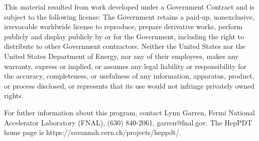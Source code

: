 This material resulted from work developed under a Government Contract
and is subject to the following license:  The Government retains a
paid-up, nonexclusive, irrevocable worldwide license to reproduce,
prepare derivative works, perform publicly and display publicly by or for
the Government,  including the right to distribute to other Government
contractors.  Neither the United States nor the United States Department
of Energy, nor any of their employees, makes any warranty, express or
implied, or assumes any legal liability or responsibility for the
accuracy, completeness, or usefulness of any  information, apparatus,
product, or process disclosed, or represents that its use would not
infringe privately owned rights.
 
For futher information about this program, contact Lynn Garren,
Fermi National Accelerator Laboratory (FNAL), (630) 840-2061,
garren@fnal.gov.  
The HepPDT home page is https://savannah.cern.ch/projects/heppdt/.

\newpage

\setcounter{page}{1}
\tableofcontents

\cleardoublepage
